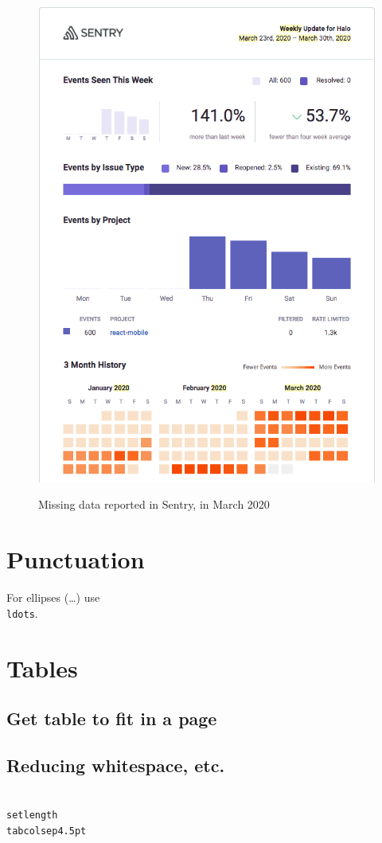 \begin{figure}[htbp!]
\begin{minipage}{.45\textwidth}
  \includegraphics[width=\textwidth]{images/localhalo/sentry-weekly-report-23-mar-2020.png}
  \label{fig:localhalo-sentry-weekly-report-23-mar-2020}
\end{minipage}
    \caption{Missing data reported in Sentry, in March 2020}
    \label{fig:sentry-missing-data-march-2020}
\end{figure}

\section{Punctuation}

For ellipses (\ldots) use \texttt{\\ldots}.

\section{Tables}

\subsection{Get table to fit in a page}

\subsection{Reducing whitespace, etc.}

\texttt{\\setlength\\tabcolsep{4.5pt}} %
